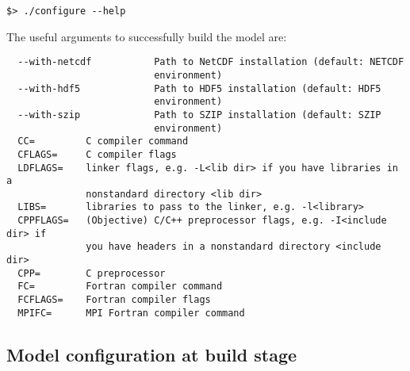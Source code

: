 \begin{Verbatim}
$> ./configure --help
\end{Verbatim}

The useful arguments to successfully build the model are:

\begin{Verbatim}
  --with-netcdf           Path to NetCDF installation (default: NETCDF
                          environment)
  --with-hdf5             Path to HDF5 installation (default: HDF5
                          environment)
  --with-szip             Path to SZIP installation (default: SZIP
                          environment)
  CC=         C compiler command
  CFLAGS=     C compiler flags
  LDFLAGS=    linker flags, e.g. -L<lib dir> if you have libraries in a
              nonstandard directory <lib dir>
  LIBS=       libraries to pass to the linker, e.g. -l<library>
  CPPFLAGS=   (Objective) C/C++ preprocessor flags, e.g. -I<include dir> if
              you have headers in a nonstandard directory <include dir>
  CPP=        C preprocessor
  FC=         Fortran compiler command
  FCFLAGS=    Fortran compiler flags
  MPIFC=      MPI Fortran compiler command
\end{Verbatim}

\subsection{Model configuration at build stage}
\label{modconf}

